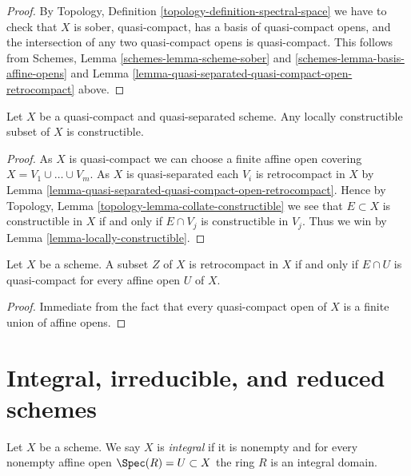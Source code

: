 \begin{proof}
By Topology, Definition \ref{topology-definition-spectral-space}
we have to check that $X$ is sober, quasi-compact, has a basis
of quasi-compact opens, and the intersection of any two
quasi-compact opens is quasi-compact. This follows from
Schemes, Lemma \ref{schemes-lemma-scheme-sober} and
\ref{schemes-lemma-basis-affine-opens}
and
Lemma \ref{lemma-quasi-separated-quasi-compact-open-retrocompact}
above.
\end{proof}

\begin{lemma}
\label{lemma-constructible-quasi-compact-quasi-separated}
Let $X$ be a quasi-compact and quasi-separated scheme.
Any locally constructible subset of $X$ is constructible.
\end{lemma}

\begin{proof}
As $X$ is quasi-compact we can choose a finite affine open covering
$X = V_1 \cup \ldots \cup V_m$. As $X$ is quasi-separated each $V_i$ is
retrocompact in $X$ by
Lemma \ref{lemma-quasi-separated-quasi-compact-open-retrocompact}.
Hence by
Topology, Lemma \ref{topology-lemma-collate-constructible}
we see that $E \subset X$ is constructible in $X$ if and only if
$E \cap V_j$ is constructible in $V_j$. Thus we win by
Lemma \ref{lemma-locally-constructible}.
\end{proof}

\begin{lemma}
\label{lemma-retrocompact}
Let $X$ be a scheme. A subset $Z$ of $X$ is retrocompact in $X$ if and only if
$E \cap U$ is quasi-compact for every affine open $U$ of $X$.
\end{lemma}

\begin{proof}
Immediate from the fact that every quasi-compact open of $X$ is a finite
union of affine opens.
\end{proof}





\section{Integral, irreducible, and reduced schemes}
\label{section-integral}

\begin{definition}
\label{definition-integral}
Let $X$ be a scheme. We say $X$ is {\it integral} if it is nonempty and
for every nonempty affine open $\Spec(R) = U \subset X$ the ring $R$
is an integral domain.
\end{definition}

